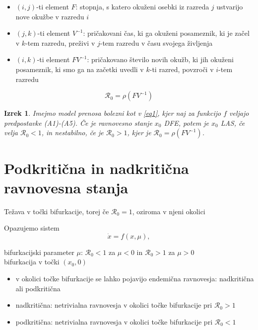 \documentclass[11pt]{beamer}
\newcommand{\R}{\mathcal R}
\newtheorem{izrek}{Izrek}
\begin{document}
\begin{frame}
    \begin{itemize}
    \item \((i,j)\)-ti element \(F\): stopnja, s katero okuženi osebki iz razreda \(j\)
    ustvarijo nove okužbe v razredu \(i\)
    \item \((j,k)\)-ti element \(V^{-1}\): pričakovani čas, ki ga okuženi posameznik, ki je začel v \(k\)-tem razredu, 
    preživi v \(j\)-tem razredu v času svojega življenja
    \item \((i,k)\)-ti element  \(FV^{-1}\): pričakovano število novih okužb, ki jih okuženi posameznik, ki 
    smo ga na začetki uvedli v \(k\)-ti razred, povzroči v \(i\)-tem razredu
    \end{itemize}
    \[\R_0=\rho(FV^{-1})\]
\end{frame}

\begin{frame}
    \begin{izrek}\label{izrek1}
        Imejmo model prenosa bolezni kot v \ref{eq1}, kjer naj za funkcijo \(f\) veljajo
        predpostavke (A1)-(A5). Če je ravnovesno stanje \(x_0\) DFE, potem je \(x_0\) LAS, 
        če velja \(\R_0<1\), in nestabilno, če je \(\R_0>1\), kjer je \(\R_0=\rho(FV^{-1})\).
    \end{izrek}
\end{frame}


\section{Podkritična in nadkritična ravnovesna stanja}

\begin{frame}
    Težava v točki bifurkacije, torej če \(\R_0=1\), oziroma v njeni okolici

    Opazujemo sistem 
    \begin{equation}\label{eq4}
    \dot{x}=f(x,\mu),
    \end{equation}

    bifurkacijski parameter \(\mu\): \(\R_0<1\) za \(\mu<0\) in \(\R_0>1\) za \(\mu>0\)\\

    bifurkacija v točki \((x_0,0)\)
\end{frame}

\begin{frame}
    \begin{itemize}
        \item v okolici točke bifurkacije se lahko pojavijo endemična 
        ravnovesja: nadkritična ali podkritična
        \item nadkritična: netrivialna ravnovesja v okolici točke bifurkacije pri \(\R_0>1\)
        \item podkritična: netrivialna ravnovesja v okolici točke bifurkacije pri \(\R_0<1\)
    \end{itemize}
\end{frame}
\end{document}
